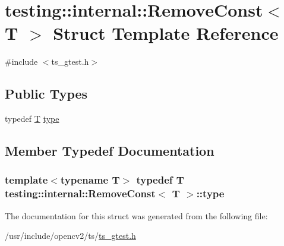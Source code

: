 \hypertarget{structtesting_1_1internal_1_1RemoveConst}{\section{testing\-:\-:internal\-:\-:Remove\-Const$<$ T $>$ Struct Template Reference}
\label{structtesting_1_1internal_1_1RemoveConst}
}


{\ttfamily \#include $<$ts\-\_\-gtest.\-h$>$}

\subsection*{Public Types}
\begin{DoxyCompactItemize}
\item 
typedef \hyperlink{calib3d_8hpp_a3efb9551a871ddd0463079a808916717}{T} \hyperlink{structtesting_1_1internal_1_1RemoveConst_a1be32027ea4edcc0d15abd59aba4a97f}{type}
\end{DoxyCompactItemize}


\subsection{Member Typedef Documentation}
\hypertarget{structtesting_1_1internal_1_1RemoveConst_a1be32027ea4edcc0d15abd59aba4a97f}{
\subsubsection[{type}]{\setlength{\rightskip}{0pt plus 5cm}template$<$typename T$>$ typedef {\bf T} {\bf testing\-::internal\-::\-Remove\-Const}$<$ {\bf T} $>$\-::{\bf type}}}\label{structtesting_1_1internal_1_1RemoveConst_a1be32027ea4edcc0d15abd59aba4a97f}


The documentation for this struct was generated from the following file\-:\begin{DoxyCompactItemize}
\item 
/usr/include/opencv2/ts/\hyperlink{ts__gtest_8h}{ts\-\_\-gtest.\-h}\end{DoxyCompactItemize}
